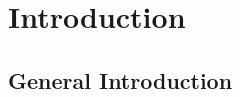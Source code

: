 \documentclass[11pt,twoside]{report}
\begin{document}
\chapter{Introduction}

\section{General Introduction}
\end{document}

